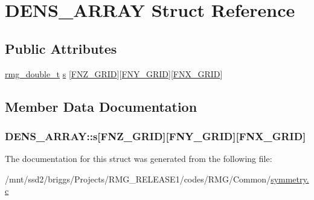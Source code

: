 \hypertarget{struct_d_e_n_s___a_r_r_a_y}{\section{D\-E\-N\-S\-\_\-\-A\-R\-R\-A\-Y Struct Reference}
\label{struct_d_e_n_s___a_r_r_a_y}
}
\subsection*{Public Attributes}
\begin{DoxyCompactItemize}
\item 
\hyperlink{rmgtypes_8h_aaa16921c14f121c56eaa42390a340db8}{rmg\-\_\-double\-\_\-t} \hyperlink{struct_d_e_n_s___a_r_r_a_y_aa63512868f91e05bf7edb1ef3c9e05bd}{s} \mbox{[}\hyperlink{my__finegrid_8h_a932063c093b64dade22a1ced5408c695}{F\-N\-Z\-\_\-\-G\-R\-I\-D}\mbox{]}\mbox{[}\hyperlink{my__finegrid_8h_aee6d0d55b96a5522ffbf5b26acce7476}{F\-N\-Y\-\_\-\-G\-R\-I\-D}\mbox{]}\mbox{[}\hyperlink{my__finegrid_8h_ad3f0b253e2a006b913b3b754f13af6df}{F\-N\-X\-\_\-\-G\-R\-I\-D}\mbox{]}
\end{DoxyCompactItemize}


\subsection{Member Data Documentation}
\hypertarget{struct_d_e_n_s___a_r_r_a_y_aa63512868f91e05bf7edb1ef3c9e05bd}{
\subsubsection[{s}]{ D\-E\-N\-S\-\_\-\-A\-R\-R\-A\-Y\-::s\mbox{[}{\bf F\-N\-Z\-\_\-\-G\-R\-I\-D}\mbox{]}\mbox{[}{\bf F\-N\-Y\-\_\-\-G\-R\-I\-D}\mbox{]}\mbox{[}{\bf F\-N\-X\-\_\-\-G\-R\-I\-D}\mbox{]}}}\label{struct_d_e_n_s___a_r_r_a_y_aa63512868f91e05bf7edb1ef3c9e05bd}


The documentation for this struct was generated from the following file\-:\begin{DoxyCompactItemize}
\item 
/mnt/ssd2/briggs/\-Projects/\-R\-M\-G\-\_\-\-R\-E\-L\-E\-A\-S\-E1/codes/\-R\-M\-G/\-Common/\hyperlink{_r_m_g_2_common_2symmetry_8c}{symmetry.\-c}\end{DoxyCompactItemize}
